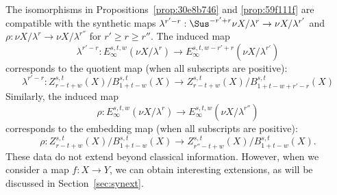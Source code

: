 \documentclass{amsart}
\numberwithin{equation}{section}
\begin{document}
\begin{remark}
    The isomorphisms in Propositions~\ref{prop:30e8b746} and \ref{prop:59f111f} are compatible with the synthetic maps $\lambda^{r'-r}: \Sus^{-r'+r}\nu X/\lambda^r\to \nu X/\lambda^{r'}$ and $\rho: \nu X/\lambda^r\to \nu X/\lambda^{r''}$ for $r'\ge r\ge r''$. The induced map
    $$\lambda^{r'-r}:E_\infty^{s,t,w}(\nu X/\lambda^r)\to E_\infty^{s,t,w-r'+r}(\nu X/\lambda^{r'})$$
    corresponds to the quotient map (when all subscripts are positive):
    $$\lambda^{r'-r}:Z_{r-t+w}^{s,t}(X)/B_{1+t-w}^{s,t}(X)\to Z_{r-t+w}^{s,t}(X)/B_{1+t-w+r'-r}^{s,t}(X)$$
    Similarly, the induced map
    $$\rho:E_\infty^{s,t,w}(\nu X/\lambda^r)\to E_\infty^{s,t,w}(\nu X/\lambda^{r''})$$
    corresponds to the embedding map (when all subscripts are positive):
    $$\rho:Z_{r-t+w}^{s,t}(X)/B_{1+t-w}^{s,t}(X)\to Z_{r''-t+w}^{s,t}(X)/B_{1+t-w}^{s,t}(X).$$
    These data do not extend beyond classical information. However, when we consider a map $f: X\to Y$, we can obtain interesting extensions, as will be discussed in Section~\ref{sec:synext}.
\end{remark}
\end{document}
